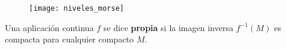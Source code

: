 \begin{figure}[h]
  	\centering
  	\texttt{[image: niveles\_morse]}
  	\label{fig:niveles_morse}
\end{figure}

\begin{definicion} Una aplicación continua $f$ se dice \textbf{propia} si la imagen inversa $f^{-1}(M)$ es compacta para cualquier compacto $M$.
\end{definicion}

\endinput
